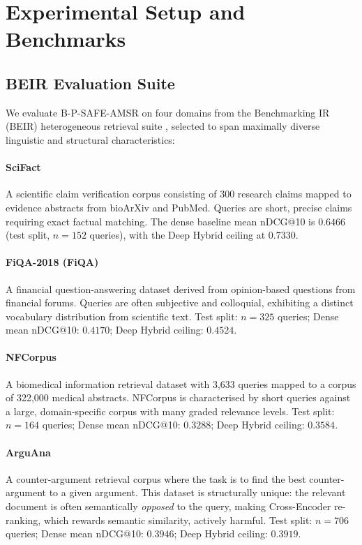 \documentclass[journal]{IEEEtran}
\begin{document}
\section{Experimental Setup and Benchmarks}
\label{sec:experiments}
\subsection{BEIR Evaluation Suite}
\label{sec:beir}

We evaluate B-P-SAFE-AMSR on four domains from the
Benchmarking IR (BEIR) heterogeneous retrieval suite
\cite{thakur2021beir}, selected to span maximally diverse
linguistic and structural characteristics:

\paragraph{SciFact} A scientific claim verification corpus
consisting of 300 research claims mapped to evidence abstracts
from bioArXiv and PubMed. Queries are short, precise claims
requiring exact factual matching. The dense baseline mean
nDCG@10 is $0.6466$ (test split, $n=152$ queries), with the
Deep Hybrid ceiling at $0.7330$.

\paragraph{FiQA-2018 (FiQA)} A financial question-answering
dataset derived from opinion-based questions from financial
forums. Queries are often subjective and colloquial, exhibiting
a distinct vocabulary distribution from scientific text.
Test split: $n=325$ queries; Dense mean nDCG@10: $0.4170$;
Deep Hybrid ceiling: $0.4524$.

\paragraph{NFCorpus} A biomedical information retrieval
dataset with 3,633 queries mapped to a corpus of 322,000
medical abstracts. NFCorpus is characterised by short
queries against a large, domain-specific corpus with many
graded relevance levels. Test split: $n=164$ queries;
Dense mean nDCG@10: $0.3288$; Deep Hybrid ceiling:
$0.3584$.

\paragraph{ArguAna} A counter-argument retrieval corpus where
the task is to find the best counter-argument to a given
argument. This dataset is structurally unique: the relevant
document is often semantically \emph{opposed} to the query,
making Cross-Encoder re-ranking, which rewards semantic
similarity, actively harmful. Test split: $n=706$ queries;
Dense mean nDCG@10: $0.3946$; Deep Hybrid ceiling: $0.3919$.
\end{document}
